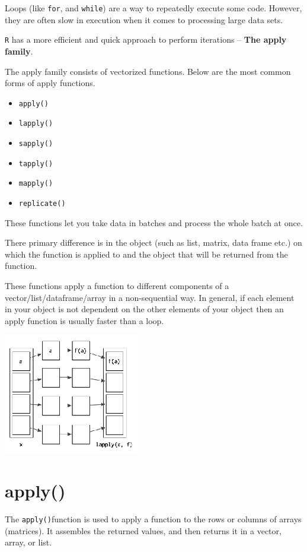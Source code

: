 \documentclass[
]{book}
\providecommand{\tightlist}{%
  \setlength{\itemsep}{0pt}\setlength{\parskip}{0pt}}
\begin{document}
Loops (like \texttt{for}, and \texttt{while}) are a way to repeatedly execute some code. However, they are often slow in execution when it comes to processing large data sets.

\texttt{R} has a more efficient and quick approach to perform iterations -- \textbf{The apply family}.

The apply family consists of vectorized functions. Below are the most common forms of apply functions.

\begin{itemize}
\tightlist
\item
  \texttt{apply()}
\item
  \texttt{lapply()}
\item
  \texttt{sapply()}
\item
  \texttt{tapply()}
\item
  \texttt{mapply()}
\item
  \texttt{replicate()}
\end{itemize}

These functions let you take data in batches and process the whole batch at once.

There primary difference is in the object (such as list, matrix, data frame etc.) on which the function is applied to and the object that will be returned from the function.

These functions apply a function to different components of a vector/list/dataframe/array in a non-sequential way. In general, if each element in your object is not dependent on the other elements of your object then an apply function is usually faster than a loop.

\begin{center}\includegraphics[width=0.3\linewidth]{images/lapplyGraphic} \end{center}

\hypertarget{apply-1}{%
\section{apply()}\label{apply-1}}

The \texttt{apply()}function is used to apply a function to the rows or columns of arrays (matrices). It assembles the returned values, and then returns it in a vector, array, or list.
\end{document}
